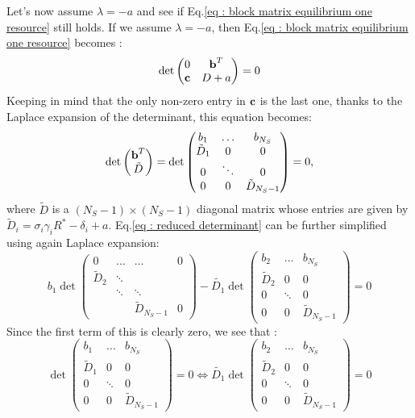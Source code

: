 \documentclass[12pt, titlepage]{report}
\begin{document}
	Let's now assume $\lambda = -a$ and see if Eq.\eqref{eq : block matrix equilibrium one resource} still holds. If we assume $\lambda=-a$, then Eq.\eqref{eq : block matrix equilibrium one resource} becomes :
	\begin{equation}
	\det
	\begin{pmatrix}
		0 & \textbf{b}^T\\
		\textbf{c} & D+a
	\end{pmatrix} =0
	\end{equation}
	Keeping in mind that the only non-zero entry in $\textbf{c}$ is the last one, thanks to the Laplace expansion of the determinant, this equation becomes:
	\begin{equation}
		\det
		\begin{pmatrix}
			\textbf{b}^T \\
			\tilde{D}
		\end{pmatrix}
		=
		\det
		\begin{pmatrix}
			b_1 & \dots & b_{N_S} \\
			\tilde{D}_1 & 0 & 0 \\
			0 & \ddots & 0 \\
			0 & 0 & \tilde{D}_{N_S-1}
		\end{pmatrix}
		=0, \label{eq : reduced determinant}
	\end{equation}
	where $\tilde{D}$ is a $(N_S-1)\times(N_S-1)$ diagonal matrix whose entries are given by $\tilde{D}_i = \sigma_i \gamma_i R^* - \delta_i +a$. Eq.\eqref{eq : reduced determinant} can be further simplified using again Laplace expansion:
	\begin{equation}
		b_1 \det
		\begin{pmatrix}
			0 & \dots & \dots& 0 \\
			\tilde{D}_2 & \ddots & & \\
			 & \ddots & \ddots & \\
			&  & \tilde{D}_{N_S-1} & 0
		\end{pmatrix}
		- \tilde{D_1} \det
		\begin{pmatrix}
			b_2 & \dots & b_{N_S} \\
			\tilde{D}_2 &  0 & 0 \\
			0 & \ddots & 0 \\
			0 & 0 & \tilde{D}_{N_S-1}
		\end{pmatrix} = 0
	\end{equation}
	Since the first term of this is clearly zero, we see that :
	\begin{equation}
		\det
		\begin{pmatrix}
			b_1 & \dots & b_{N_S} \\
			\tilde{D}_1 & 0 & 0 \\
			0 & \ddots & 0 \\
			0 & 0 & \tilde{D}_{N_S-1}
		\end{pmatrix} = 0 \iff \tilde{D_1} \det
		\begin{pmatrix}
			b_2 & \dots & b_{N_S} \\
			\tilde{D}_2 &  0 & 0 \\
			0 & \ddots & 0 \\
			0 & 0 & \tilde{D}_{N_S-1}
		\end{pmatrix} = 0
	\end{equation}
\end{document}
